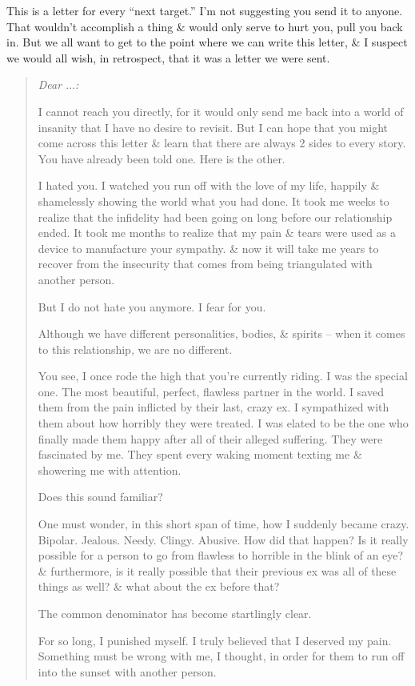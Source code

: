\documentclass{article}
\numberwithin{equation}{section}
\begin{document}
This is a letter for every ``next target.'' I'm not suggesting you send it to anyone. That wouldn't accomplish a thing \& would only serve to hurt you, pull you back in. But we all want to get to the point where we can write this letter, \& I suspect we would all wish, in retrospect, that it was a letter we were sent.
\begin{quote}\it
	Dear $\ldots$:
	
	I cannot reach you directly, for it would only send me back into a world of insanity that I have no desire to revisit. But I can hope that you might come across this letter \& learn that there are always 2 sides to every story. You have already been told one. Here is the other.
	
	I hated you. I watched you run off with the love of my life, happily \& shamelessly showing the world what you had done. It took me weeks to realize that the infidelity had been going on long before our relationship ended. It took me months to realize that my pain \& tears were used as a device to manufacture your sympathy. \& now it will take me years to recover from the insecurity that comes from being triangulated with another person.
	
	But I do not hate you anymore. I fear for you.
	
	Although we have different personalities, bodies, \& spirits -- when it comes to this relationship, we are no different.
	
	You see, I once rode the high that you're currently riding. I was the special one. The most beautiful, perfect, flawless partner in the world. I saved them from the pain inflicted by their last, crazy ex. I sympathized with them about how horribly they were treated. I was elated to be the one who finally made them happy after all of their alleged suffering. They were fascinated by me. They spent every waking moment texting me \& showering me with attention.
	
	Does this sound familiar?
	
	One must wonder, in this short span of time, how I suddenly became crazy. Bipolar. Jealous. Needy. Clingy. Abusive. How did that happen? Is it really possible for a person to go from flawless to horrible in the blink of an eye? \& furthermore, is it really possible that their previous ex was all of these things as well? \& what about the ex before that?
	
	The common denominator has become startlingly clear.
	
	For so long, I punished myself. I truly believed that I deserved my pain. Something must be wrong with me, I thought, in order for them to run off into the sunset with another person.
	

\end{quote}
\end{document}
